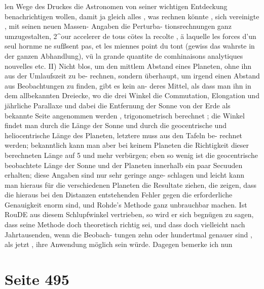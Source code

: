 \documentclass[10pt,a4paper]{article}
\begin{document}
len Wege  des  Druckes  die  Astronomen  von  seiner  wichtigen  Entdeckung  benachrichtigen  wollen,  damit
ja  gleich  alles ,  was  rechnen  könnte ,  sich  vereinigte ,  mit  seinen  neuen  Massen- Angaben  die  Perturba-
tionsrechnungen  ganz  umzugestalten,  2\textasciicircum{}our  accelerer  de  tous  cötes  la  recolte ,  ä  laquelle  les  forces  d'un  seul
hornme  ne  sufßsent  pas,  et  les  miennes  point  du  tont  (gewiss  das  wahrste  in  der  ganzen  Abhandlung),
vü  la  grande  quantite  de  comhinaisons  analytiques  nouvelles  etc.
II)  Nicht  blos,  um  den  mittlem  Abstand  eines  Planeten,  ohne  ihn  aus  der  Umlaufszeit  zu  be-
rechnen, sondern  überhaupt,  um  irgend  einen  Abstand  aus  Beobachtungen  zu  finden,  gibt  es  kein  an-
deres Mittel,  als  dass  man  ihn  in  dem  allbekannten  Dreiecke,  wo  die  drei  Winkel  die  Commutation,
Elongation  und  jährliche  Parallaxe  und  dabei  die  Entfernung  der  Sonne  von  der  Erde  als  bekannte
Seite  angenommen  werden ,  trigonometrisch  berechnet ;  die  Winkel  findet  man  durch  die  Länge  der  Sonne
und  durch  die  geocentrische  und  heliocentrische  Länge  des  Planeten,  letztere  muss  aus  den  Tafeln  be-
rechnet werden;  bekanntlich  kann  man  aber  bei  keinem  Planeten  die  Richtigkeit  dieser  berechneten
Länge  auf  5\glqq{}  und  mehr  verbürgen;  eben  so  wenig  ist  die  geocentrische  beobachtete  Länge  der  Sonne
und  der  Planeten  innerhalb  ein  paar  Secuuden  erhalten;  diese  Angaben  sind  nur  sehr  geringe  ange-
schlagen und  leicht  kann  man  hieraus  für  die  verschiedenen  Planeten  die  Resultate  ziehen,  die  zeigen,
dass  die  hieraus  bei  den  Distanzen  entstehenden  Fehler  gegen  die  erforderliche  Genauigkeit  enorm  sind,
und  Rohde's  Methode  ganz  unbrauchbar  machen.
Ist  RouDE  aus  diesem  Schlupfwinkel  vertrieben,  so  wird  er  sich  begnügen  zu  sagen,  dass  seine
Methode  doch  theoretisch  richtig  sei,  und  dass  doch  vielleicht  nach  Jahrtausenden,  wenn  die  Beobach-
tungen zehn  oder  hundertmal  genauer  sind ,  als  jetzt ,  ihre  Anwendung  möglich  sein  würde.  Dagegen
bemerke  ich  nun

\newpage
\section*{Seite 495}
\end{document}
